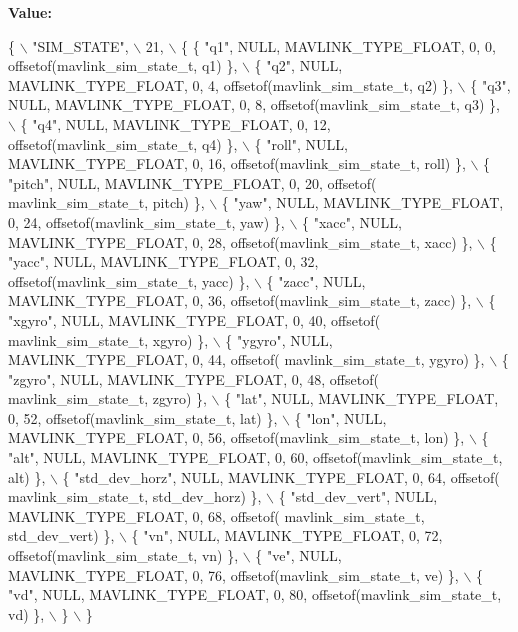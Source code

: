 {\bfseries Value\+:}
\begin{DoxyCode}
\{ \(\backslash\)
    \textcolor{stringliteral}{"SIM\_STATE"}, \(\backslash\)
    21, \(\backslash\)
    \{  \{ \textcolor{stringliteral}{"q1"}, NULL, MAVLINK_TYPE_FLOAT, 0, 0, offsetof(mavlink_sim_state_t, q1) \}, \(\backslash\)
         \{ \textcolor{stringliteral}{"q2"}, NULL, MAVLINK_TYPE_FLOAT, 0, 4, offsetof(mavlink_sim_state_t, q2) \}, \(\backslash\)
         \{ \textcolor{stringliteral}{"q3"}, NULL, MAVLINK_TYPE_FLOAT, 0, 8, offsetof(mavlink_sim_state_t, q3) \}, \(\backslash\)
         \{ \textcolor{stringliteral}{"q4"}, NULL, MAVLINK_TYPE_FLOAT, 0, 12, offsetof(mavlink_sim_state_t, q4) \}, \(\backslash\)
         \{ \textcolor{stringliteral}{"roll"}, NULL, MAVLINK_TYPE_FLOAT, 0, 16, offsetof(mavlink_sim_state_t, roll) \}, \(\backslash\)
         \{ \textcolor{stringliteral}{"pitch"}, NULL, MAVLINK_TYPE_FLOAT, 0, 20, offsetof(
      mavlink_sim_state_t, pitch) \}, \(\backslash\)
         \{ \textcolor{stringliteral}{"yaw"}, NULL, MAVLINK_TYPE_FLOAT, 0, 24, offsetof(mavlink_sim_state_t, yaw) \}, \(\backslash\)
         \{ \textcolor{stringliteral}{"xacc"}, NULL, MAVLINK_TYPE_FLOAT, 0, 28, offsetof(mavlink_sim_state_t, xacc) \}, \(\backslash\)
         \{ \textcolor{stringliteral}{"yacc"}, NULL, MAVLINK_TYPE_FLOAT, 0, 32, offsetof(mavlink_sim_state_t, yacc) \}, \(\backslash\)
         \{ \textcolor{stringliteral}{"zacc"}, NULL, MAVLINK_TYPE_FLOAT, 0, 36, offsetof(mavlink_sim_state_t, zacc) \}, \(\backslash\)
         \{ \textcolor{stringliteral}{"xgyro"}, NULL, MAVLINK_TYPE_FLOAT, 0, 40, offsetof(
      mavlink_sim_state_t, xgyro) \}, \(\backslash\)
         \{ \textcolor{stringliteral}{"ygyro"}, NULL, MAVLINK_TYPE_FLOAT, 0, 44, offsetof(
      mavlink_sim_state_t, ygyro) \}, \(\backslash\)
         \{ \textcolor{stringliteral}{"zgyro"}, NULL, MAVLINK_TYPE_FLOAT, 0, 48, offsetof(
      mavlink_sim_state_t, zgyro) \}, \(\backslash\)
         \{ \textcolor{stringliteral}{"lat"}, NULL, MAVLINK_TYPE_FLOAT, 0, 52, offsetof(mavlink_sim_state_t, lat) \}, \(\backslash\)
         \{ \textcolor{stringliteral}{"lon"}, NULL, MAVLINK_TYPE_FLOAT, 0, 56, offsetof(mavlink_sim_state_t, lon) \}, \(\backslash\)
         \{ \textcolor{stringliteral}{"alt"}, NULL, MAVLINK_TYPE_FLOAT, 0, 60, offsetof(mavlink_sim_state_t, alt) \}, \(\backslash\)
         \{ \textcolor{stringliteral}{"std\_dev\_horz"}, NULL, MAVLINK_TYPE_FLOAT, 0, 64, offsetof(
      mavlink_sim_state_t, std\_dev\_horz) \}, \(\backslash\)
         \{ \textcolor{stringliteral}{"std\_dev\_vert"}, NULL, MAVLINK_TYPE_FLOAT, 0, 68, offsetof(
      mavlink_sim_state_t, std\_dev\_vert) \}, \(\backslash\)
         \{ \textcolor{stringliteral}{"vn"}, NULL, MAVLINK_TYPE_FLOAT, 0, 72, offsetof(mavlink_sim_state_t, vn) \}, \(\backslash\)
         \{ \textcolor{stringliteral}{"ve"}, NULL, MAVLINK_TYPE_FLOAT, 0, 76, offsetof(mavlink_sim_state_t, ve) \}, \(\backslash\)
         \{ \textcolor{stringliteral}{"vd"}, NULL, MAVLINK_TYPE_FLOAT, 0, 80, offsetof(mavlink_sim_state_t, vd) \}, \(\backslash\)
         \} \(\backslash\)
\}
\end{DoxyCode}
